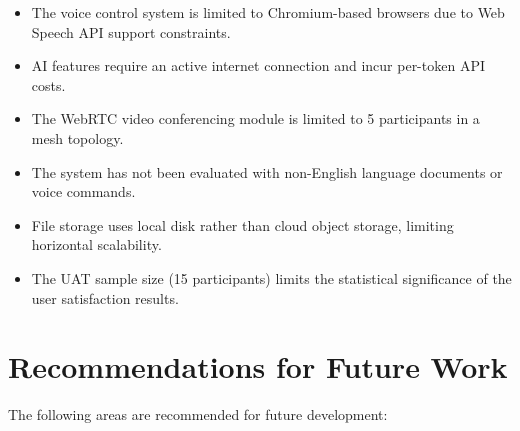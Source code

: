 \documentclass[12pt,a4paper]{report}
\begin{document}
\begin{itemize}
    \item The voice control system is limited to Chromium-based browsers due to Web Speech API support constraints.
    \item AI features require an active internet connection and incur per-token API costs.
    \item The WebRTC video conferencing module is limited to 5 participants in a mesh topology.
    \item The system has not been evaluated with non-English language documents or voice commands.
    \item File storage uses local disk rather than cloud object storage, limiting horizontal scalability.
    \item The UAT sample size (15 participants) limits the statistical significance of the user satisfaction results.
\end{itemize}

\section{Recommendations for Future Work}

The following areas are recommended for future development:
\end{document}
